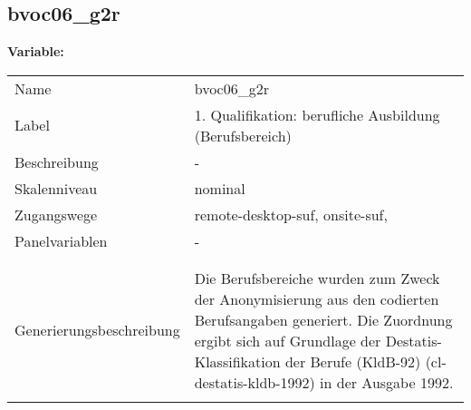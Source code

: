 	
	
	\subsection{bvoc06\_g2r}
	\label{subSection:bvoc06_g2r}

	\noindent\textbf{Variable:}\\
		\begin{tabular}{lL{11.3cm}}
			\label{tableVariable:bvoc06_g2r}
			Name & bvoc06\_g2r \\
			Label & 1. Qualifikation: berufliche Ausbildung (Berufsbereich) \\
			Beschreibung & - \\
			Skalenniveau & nominal \\
			Zugangswege &
				remote-desktop-suf,
				onsite-suf,
 \\
			Panelvariablen & -
			 \\
			 \\
 \\
					Generierungsbeschreibung & Die Berufsbereiche wurden zum Zweck der Anonymisierung aus den codierten Berufsangaben generiert. Die Zuordnung ergibt sich auf Grundlage der Destatis-Klassifikation der Berufe (KldB-92) (cl-destatis-kldb-1992) in der Ausgabe 1992. 
				 \\	
			 \\
		\end{tabular}






